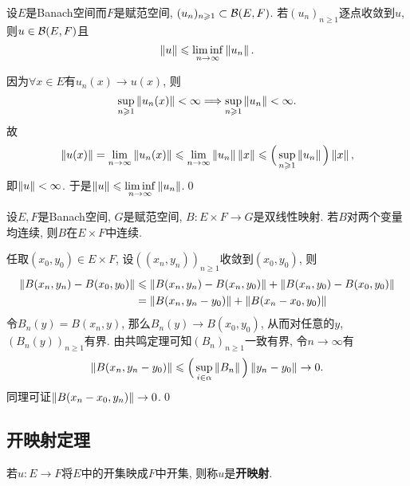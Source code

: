 \begin{Corollary}\label{cor:逐点收敛}
	设$ E $是Banach空间而$ F $是赋范空间, $ (u_n)_{n\geqslant 1}\subset\mathcal{B}(E,F) $. 若$ (u_n)_{n\geqslant 1} $逐点收敛到$ u $, 则$ u\in\mathcal{B}(E,F) $且
	\[
		\left\| u \right\|\leqslant\liminf_{n\to\infty}\left\| u_n \right\|.
	\]
\end{Corollary}
\begin{Proof}
	因为$ \forall x\in E $有$ u_n(x)\to u(x) $, 则
	\[
		\sup_{n\geqslant 1}\left\| u_n(x) \right\|<\infty\Longrightarrow\sup_{n\geqslant 1}\left\| u_n \right\|<\infty.
	\]
	故
	\[
		\left\| u(x) \right\|=\lim_{n\to\infty}\left\| u_n(x) \right\|\leqslant\lim_{n\to\infty}\left\| u_n \right\|\left\| x \right\|\leqslant\Big( \sup_{n\geqslant 1}\left\| u_n \right\| \Big)\left\| x \right\|,
	\]
	即$ \left\| u \right\|<\infty $. 于是$ \left\| u \right\|\leqslant\liminf\limits_{n\to\infty}\left\| u_n \right\| $.\qed
\end{Proof}

\begin{Corollary}\label{cor:双线性映射连续性}
	设$ E, F $是Banach空间, $ G $是赋范空间, $ B : E\times F\to G $是双线性映射. 若$ B $对两个变量均连续, 则$ B $在$ E\times F $中连续.
\end{Corollary}
\begin{Proof}
	任取$ (x_0,y_0)\in E\times F $, 设$ ((x_n,y_n))_{n\geqslant 1} $收敛到$ (x_0,y_0) $, 则
	\[
		\begin{aligned}
			\left\| B(x_n,y_n)-B(x_0,y_0) \right\| & \leqslant\left\| B(x_n,y_n)-B(x_n,y_0) \right\|+\left\| B(x_n,y_0)-B(x_0,y_0) \right\| \\
			                             & =\left\| B(x_n,y_n-y_0) \right\|+\left\| B(x_n-x_0,y_0) \right\|
		\end{aligned}
	\]
	令$ B_n(y)=B(x_n,y) $, 那么$ B_n(y)\to B(x_0,y_0) $, 从而对任意的$ y $, $ (B_n(y))_{n\geqslant 1} $有界. 由共鸣定理可知$ (B_n)_{n\geqslant 1} $一致有界, 令$ n\to\infty $有
	\[
		\left\| B(x_n,y_n-y_0) \right\|\leqslant\Big( \sup_{i\in\alpha}\left\| B_n \right\| \Big)\left\| y_n-y_0 \right\|\to 0.
	\]
	同理可证$ \left\| B(x_n-x_0,y_n) \right\|\to 0 $.\qed
\end{Proof}

\subsection{开映射定理}

\begin{Definition}[开映射]
	若$ u : E\to F $将$ E $中的开集映成$ F $中开集, 则称$ u $是\textbf{开映射}.
\end{Definition}

